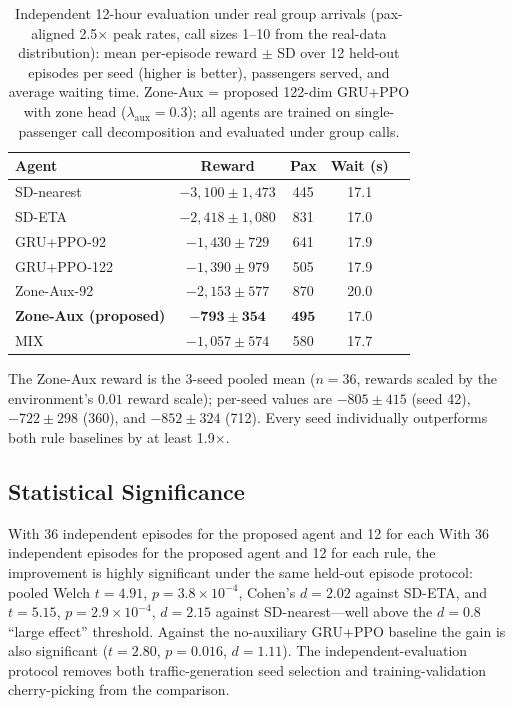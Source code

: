 \documentclass{IEEEcsmag}
\begin{document}
\begin{table}[t]
\centering
\caption{Independent 12-hour evaluation under real group arrivals
(pax-aligned 2.5$\times$ peak rates, call sizes 1--10 from the
real-data distribution): mean per-episode reward $\pm$ SD over 12
held-out episodes per seed (higher is better), passengers served, and
average waiting time. Zone-Aux = proposed 122-dim GRU+PPO with zone
head ($\lambda_{\text{aux}} = 0.3$); all agents are trained on
single-passenger call decomposition and evaluated under group calls.}
\label{tab:main_results}
\begin{tabular}{@{}lcccc@{}}
\toprule
Agent & Reward & Pax & Wait (s) \\
\midrule
SD-nearest & $-3{,}100 \pm 1{,}473$ & 445 & 17.1 \\
SD-ETA     & $-2{,}418 \pm 1{,}080$ & 831 & 17.0 \\
GRU+PPO-92 & $-1{,}430 \pm 729$ & 641 & 17.9 \\
GRU+PPO-122 & $-1{,}390 \pm 979$ & 505 & 17.9 \\
Zone-Aux-92 & $-2{,}153 \pm 577$ & 870 & 20.0 \\
\textbf{Zone-Aux (proposed)} & $\mathbf{-793 \pm 354}$ &
$\mathbf{495}$ & $\mathbf{17.0}$ \\
MIX & $-1{,}057 \pm 574$ & 580 & 17.7 \\
\bottomrule
\end{tabular}
\end{table}

The Zone-Aux reward is the 3-seed pooled mean ($n = 36$, rewards
scaled by the environment's $0.01$ reward scale); per-seed values are
$-805 \pm 415$ (seed 42), $-722 \pm 298$ (360), and $-852 \pm 324$
(712). Every seed individually outperforms both rule baselines by at
least 1.9$\times$.

\subsection{Statistical Significance}

With 36 independent episodes for the proposed agent and 12 for each
With 36 independent episodes for the proposed agent and 12 for each
rule, the improvement is highly significant under the same held-out
episode protocol: pooled Welch $t = 4.91$, $p = 3.8\times10^{-4}$,
Cohen's $d = 2.02$ against SD-ETA, and $t = 5.15$, $p = 2.9\times
10^{-4}$, $d = 2.15$ against SD-nearest---well above the $d = 0.8$
``large effect'' threshold. Against the no-auxiliary GRU+PPO baseline
the gain is also significant ($t = 2.80$, $p = 0.016$, $d = 1.11$).
The independent-evaluation protocol removes both traffic-generation
seed selection and training-validation cherry-picking from the
comparison.
\end{document}
